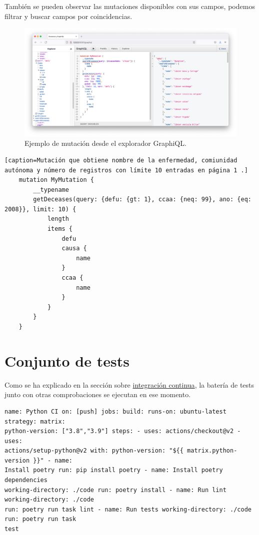 También se pueden observar las mutaciones disponibles con sus campos, podemos filtrar y
buscar campos por coincidencias.

\FloatBarrier
\begin{figure}[h]
	\centering	
	\includegraphics[width=\textwidth]{doc/logos/imgs/mutaciones-graph.png}
	\caption{ Ejemplo de mutación desde el explorador GraphiQL. }
    \label{fig:graficos-GraphiQL}
\end{figure}
\FloatBarrier

\begin{lstlisting}[caption=Mutación que obtiene nombre de la enfermedad, comiunidad autónoma y número de registros con límite 10 entradas en página 1 .] 
    mutation MyMutation {
        __typename
        getDeceases(query: {defu: {gt: 1}, ccaa: {neq: 99}, ano: {eq: 2008}}, limit: 10) {
            length
            items {
                defu
                causa {
                    name
                }
                ccaa {
                    name
                }
            }
        }
    }
\end{lstlisting}

\section{Conjunto de tests}
Como se ha explicado en la sección sobre \hyperref[sec:ci]{integración continua}, la
batería de tests junto con otras comprobaciones se ejecutan en ese momento.

\begin{lstlisting}[caption=Definición de las etapas de la CI del código del proyecto donde se puede apreciar que se especifican las versiones del lenguaje a comprobar. ]
    name: Python CI on: [push] jobs: build: runs-on: ubuntu-latest strategy: matrix:
python-version: ["3.8","3.9"] steps: - uses: actions/checkout@v2 - uses:
actions/setup-python@v2 with: python-version: "${{ matrix.python-version }}" - name:
Install poetry run: pip install poetry - name: Install poetry dependencies
working-directory: ./code run: poetry install - name: Run lint working-directory: ./code
run: poetry run task lint - name: Run tests working-directory: ./code run: poetry run task
test
\end{lstlisting}

